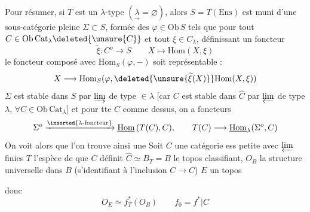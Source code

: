 Pour résumer, si $T$ est un $\lambda$-type $(\underset{\rightarrow}{\lambda}=\varnothing)$, alors
 $S=T(\mathrm{Ens})$ est muni d'une sous-catégorie
pleine $\Sigma\subset S$, formée des $\varphi\in\mathrm{Ob}\,S$ tels que pour
tout $C\in\mathrm{Ob}\,\mathrm{Cat}_{\lambda}\deleted{\unsure{C}}$ et tout  $\xi\in C_\lambda$, 
 définissant un  foncteur
\[
 \widetilde\xi:C^o\longrightarrow S\qquad X\longmapsto\mathrm{Hom}(X,\xi)
\]
le foncteur composé avec $\mathrm{Hom}_S(\varphi,-)$ soit
représentable :
\[
 X\longrightarrow\mathrm{Hom}_S(\varphi,\deleted{\unsure{\widetilde\xi(X)}}\mathrm{Hom}(X,\xi))
\]
$\Sigma$ est stable dans $S$ par $\varinjlim$  de type $\in\lambda$ \deleted{\unsure{\xi}} [car $C$
est stable dans $\widehat C$ par $\varprojlim$ de type $\lambda$, $\forall C\in\mathrm{Ob}\,\mathrm{Cat}_{\lambda}$]
et pour tte $C$ comme dessus, on a  foncteurs
\[
 \Sigma^o\xrightarrow{\inserted{\lambda\text{-foncteur}}}\underline{\mathrm{Hom}}\,(T(C),C),\qquad T(C)\longrightarrow\underline{\mathrm{Hom}}_\lambda(\Sigma^o,C)
\]
On voit alors que l'on trouve ainsi une
Soit $C$ une catégorie ess petite avec $\varprojlim$ finies
$T$ l'espèce de  que $C$ définit
$\widehat C\simeq B_T=B$ le topos classifiant, $O_B$ la structure universelle
dans $B$ (s'identifiant à l'inclusion $C\longrightarrow\widehat C$)
$E$ un topos

 donc
\[
 O_E\simeq f_T^*(O_B)\qquad f_0=f^*|C
\]

